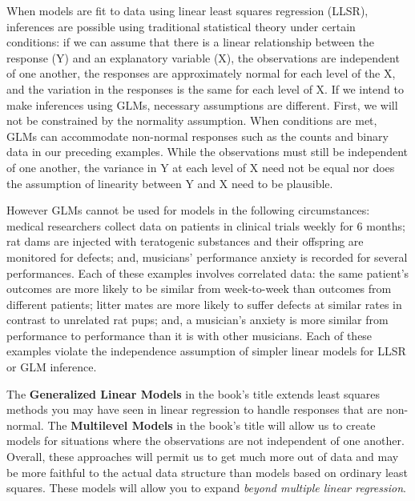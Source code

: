 \documentclass[
]{krantz}
\begin{document}
When models are fit to data using linear least squares regression (LLSR),  inferences are possible using traditional statistical theory under certain conditions: if we can assume that there is a linear relationship between the response (Y) and an explanatory variable (X), the observations are independent of one another, the responses are approximately normal for each level of the X, and the variation in the responses is the same for each level of X. If we intend to make inferences using GLMs, necessary assumptions are different. First, we will not be constrained by the normality assumption. When conditions are met, GLMs can accommodate non-normal responses such as the counts and binary data in our preceding examples. While the observations must still be independent of one another, the variance in Y at each level of X need not be equal nor does the assumption of linearity between Y and X need to be plausible.

However GLMs cannot be used for models in the following circumstances: medical researchers collect data on patients in clinical trials weekly for 6 months; rat dams are injected with teratogenic substances and their offspring are monitored for defects; and, musicians' performance anxiety is recorded for several performances. Each of these examples involves correlated data: the same patient's outcomes are more likely to be similar from week-to-week than outcomes from different patients; litter mates are more likely to suffer defects at similar rates in contrast to unrelated rat pups; and, a musician's anxiety is more similar from performance to performance than it is with other musicians. Each of these examples violate the independence assumption of simpler linear models for LLSR or GLM inference.

The \textbf{Generalized Linear Models}  in the book's title extends least squares methods you may have seen in linear regression to handle responses that are non-normal. The \textbf{Multilevel Models}  in the book's title will allow us to create models for situations where the observations are not independent of one another. Overall, these approaches will permit us to get much more out of data and may be more faithful to the actual data structure than models based on ordinary least squares. These models will allow you to expand \emph{beyond multiple linear regression}.
\end{document}
